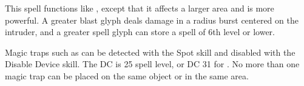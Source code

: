 \begin{spelleffect}
This spell functions like , except that it affects a larger area and is more powerful. A greater blast glyph deals damage in a \areamed radius burst centered on the intruder, and a greater spell glyph can store a spell of 6th level or lower.
\end{spelleffect}
\begin{spellnotes}
\par Magic traps such as  can be detected with the Spot skill and disabled with the Disable Device skill. The DC is 25 \add spell level, or DC 31 for . No more than one magic trap can be placed on the same object or in the same area.
\end{spellnotes}

